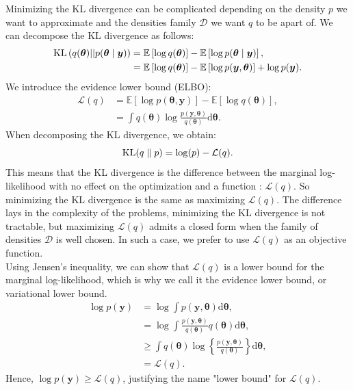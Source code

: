 \documentclass{article}
\DeclareMathOperator*{\KL}{{\rm KL}}
\begin{document}
Minimizing the KL divergence can be complicated depending on the density $p$ we want to approximate and the densities family $\mathcal{D}$ we want $q$ to be apart of. We can decompose the KL divergence as follows:
\begin{align*}
\KL\left(q(\boldsymbol{\theta})||p(\boldsymbol{\theta}\mid \boldsymbol{y})\right) &= \mathbb{E}\left[\log q(\boldsymbol{\theta})\right] - \mathbb{E}\left[\log p(\boldsymbol{\theta}\mid \boldsymbol{y})\right],\\
&= \mathbb{E}\left[\log q(\boldsymbol{\theta})\right] - \mathbb{E}\left[\log p(\boldsymbol{y},\boldsymbol{\theta})\right] + \log p(\boldsymbol{y}).
\end{align*}
We introduce the evidence lower bound (ELBO):
\begin{align*}
\mathcal{L}(q) &= \mathbb{E}\left[\log p(\boldsymbol{\theta},\boldsymbol{y})\right] - \mathbb{E}\left[\log q(\boldsymbol{\theta})\right],\\
&=\int q(\boldsymbol{\theta})\log\frac{p(\boldsymbol{y},\boldsymbol{\theta})}{q(\boldsymbol{\theta})}\mathrm{d}\boldsymbol{\theta}.
\end{align*}
When decomposing the KL divergence, we obtain:
\begin{equation*}
\KL(q\parallel p) = \log(p) - \mathcal{L}(q).
\end{equation*}
This means that the KL divergence is the difference between the marginal log-likelihood with no effect on the optimization and a function : $\mathcal{L}(q)$. So minimizing the KL divergence is the same as maximizing $\mathcal{L}(q)$. The difference lays in the complexity of the problems, minimizing the KL divergence is not tractable, but maximizing $\mathcal{L}(q)$ admits a closed form when the family of densities $\mathcal{D}$ is well chosen. In such a case, we prefer to use $\mathcal{L}(q)$ as an objective function.\\
\newline
%
Using Jensen's inequality, we can show that $\mathcal{L}(q)$ is a lower bound for the marginal log-likelihood, which is why we call it the evidence lower bound, or variational lower bound.
\begin{align*}
\log p(\boldsymbol{y}) &= \log \int p(\boldsymbol{y}, \boldsymbol{\theta}) \mathrm{d}\boldsymbol{\theta},\\
&= \log \int \frac{p(\boldsymbol{y}, \boldsymbol{\theta})}{q(\boldsymbol{\theta})}q(\boldsymbol{\theta})\mathrm{d}\boldsymbol{\theta}
,\\
&\geq \int q(\boldsymbol{\theta}) \log \left\lbrace \frac{p(\boldsymbol{y}, \boldsymbol{\theta})}{q(\boldsymbol{\theta})} \right\rbrace \mathrm{d}\boldsymbol{\theta},\\
&= \mathcal{L}(q).
\end{align*}
Hence, $\log p(\boldsymbol{y}) \geq \mathcal{L}(q)$, justifying the name "lower bound" for $\mathcal{L}(q)$.
\end{document}
